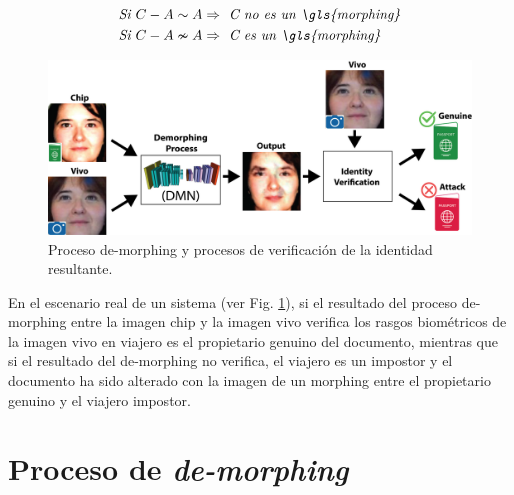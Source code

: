 \begin{equation}\label{eq:similarOrNot}
\begin{split}
\textit{Si   } &C - A \sim A \Rightarrow \textit{  C no es un \gls{morphing}}\\
\textit{Si   } &C - A \nsim A \Rightarrow \textit{  C es un \gls{morphing}}
\end{split}
\end{equation}

\begin{figure}[t!]
    \centering
    \includegraphics[width=1\textwidth]{ch-sistemasABC/images/ch-morphing/ProcesoGeneralDemorphingVerificacion.png}
    \caption{Proceso \gls{de-morphing} y procesos de verificación de la identidad resultante.}
    \label{fig:de-morphingConYSinMorphing}
\end{figure}

En el escenario real de un sistema  (ver Fig. \ref{fig:de-morphingConYSinMorphing}), si el resultado del proceso \gls{de-morphing} entre la imagen \gls{chip} y la imagen \gls{vivo} verifica los rasgos biométricos de la imagen \gls{vivo} en viajero es el propietario \gls{genuino} del documento, mientras que si el resultado del \gls{de-morphing} no verifica, el viajero es un \gls{impostor} y el documento ha sido alterado con la imagen de un \gls{morphing} entre el propietario \gls{genuino} y el viajero \gls{impostor}.

\section{Proceso de \textit{de-morphing}} \label{ref:de-morphingProcess}

